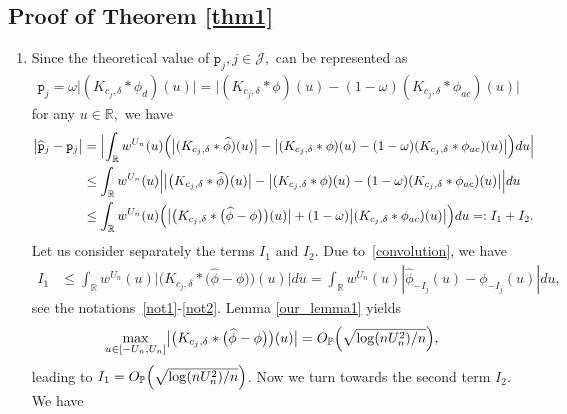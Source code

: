 \documentclass[numbers,webpdf,imaiai]{ima-authoring-template}%
\theoremstyle{thmstyletwo}%
\newcommand{\R}{\mathbb{R}}
\renewcommand{\P}{\mathbb{P}}
\newcommand{\p}{\mathtt{p}}
\newcommand{\w}{\omega}
\newcommand{\mJ}{\mathcal{J}}
\numberwithin{equation}{section}
\begin{document}
\subsection{Proof of Theorem \ref{thm1}}
\begin{enumerate}
\item Since the theoretical value of \(\p_j, j \in \mJ,\) can be represented as
 \begin{align*}
\p_j = \w \bigl|
      (K_{c_j,\delta} * \phi_d)(u)       
\bigr|
=
\bigl|
      (K_{c_j,\delta} * \phi)(u)       
      -
      (1-\w)       (K_{c_j,\delta} * \phi_{ac})(u)
\bigr|
\end{align*}
for any \(u \in \R,\)  we have
\begin{align*}
\bigl| \widehat{\p}_j - \p_j \bigr| &=
\Bigl|
\int_{\R} w^{U_n} (u) 
\Bigl(
 \bigl| 
      (K_{c_j,\delta} * \widehat{\phi})(u)       \bigr|
-     \bigl|  (K_{c_j,\delta} * \phi)(u)       
      -
      (1-\w)       (K_{c_j,\delta} * \phi_{ac})(u)\bigr|
   \Bigr) du\Bigr|
      \\
      &\leq 
\int_{\R} w^{U_n} (u)  \Bigl|
 \bigl| 
      \bigl(K_{c_j,\delta} * \widehat{\phi}\bigr)(u)       \bigr| 
 -     \bigl|  (K_{c_j,\delta} * \phi)(u)       
      -
      (1-\w)       (K_{c_j,\delta} * \phi_{ac})(u)\bigr|
   \Bigr| du\\
     &\leq 
\int_{\R} w^{U_n} (u) 
\Bigl(
 \bigl| 
      \bigl(K_{c_j,\delta} * \bigl(\widehat{\phi}-\phi\bigr)\bigr)(u)       \bigr| 
+ (1-\w)  \bigl|     (K_{c_j,\delta} * \phi_{ac})(u)\bigr| \Bigr) du =: I_1+I_2.
\end{align*}
Let us consider separately the terms \(I_1\) and \(I_2\). Due to~\eqref{convolution}, we have 
\begin{align*}
I_1 &\leq 
\int_{\R} w^{U_n} (u) 
\bigl| 
      \bigl(K_{c_j,\delta} * \bigl(\widehat{\phi}-\phi\bigr)\bigr)(u)       \bigr| du = \int_{\R} w^{U_n} (u) |
      \widehat{\phi}_{-I_j} (u) - {\phi}_{-I_j}(u)
      |  
du,
\end{align*}
see the notations~\eqref{not1}-\eqref{not2}. Lemma \ref{our_lemma1} yields
\begin{align}\label{res1}
\max_{u \in [-U_n, U_n]} 
    \bigl| \bigl(K_{c_j,\delta} * \bigl(\widehat{\phi}-\phi\bigr)\bigr)(u)       \bigr|
     =
     O_{\P} \Bigl( 
        \sqrt{
\log(nU_n^2) / n
}
        \Bigr),
\end{align}
leading to \(I_1 =  O_{\P} \Bigl( 
        \sqrt{
\log(nU_n^2) / n
}
        \Bigr)\).
Now we turn towards the second term \(I_2.\) We have 

\end{enumerate}
\end{document}
